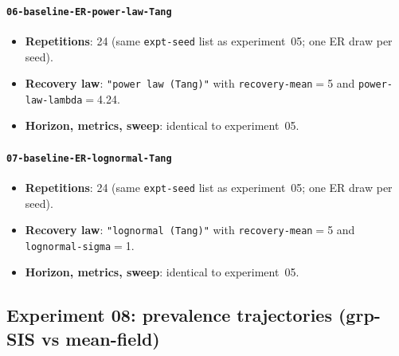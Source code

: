 \documentclass[11pt,a4paper]{article}
\begin{document}
\paragraph{\texttt{06-baseline-ER-power-law-Tang}}
\begin{itemize}[leftmargin=*]
  \item \textbf{Repetitions}: 24 (same \texttt{expt-seed} list as experiment~05; one ER draw per seed).
  \item \textbf{Recovery law}: \texttt{"power law (Tang)"} with \texttt{recovery-mean}$=$5 and \texttt{power-law-lambda}$=$4.24.
  \item \textbf{Horizon, metrics, sweep}: identical to experiment~05.
\end{itemize}

\paragraph{\texttt{07-baseline-ER-lognormal-Tang}}
\begin{itemize}[leftmargin=*]
  \item \textbf{Repetitions}: 24 (same \texttt{expt-seed} list as experiment~05; one ER draw per seed).
  \item \textbf{Recovery law}: \texttt{"lognormal (Tang)"} with \texttt{recovery-mean}$=$5 and \texttt{lognormal-sigma}$=$1.
  \item \textbf{Horizon, metrics, sweep}: identical to experiment~05.
\end{itemize}

\subsection{Experiment 08: prevalence trajectories (grp-SIS vs mean-field)}
\end{document}
